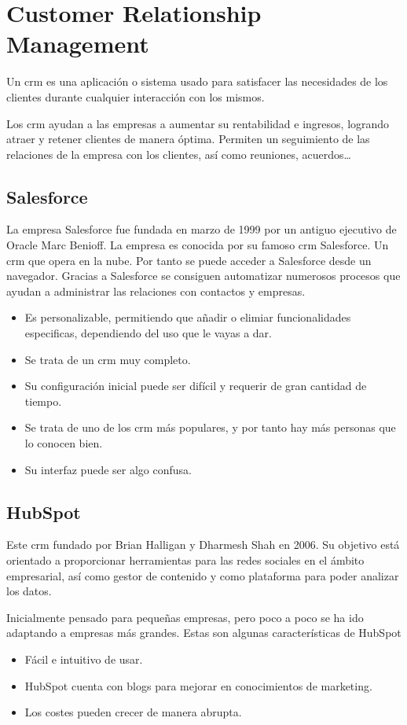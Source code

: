 \section{Customer Relationship Management}

Un \acrfull{crm} es una aplicación o sistema usado para satisfacer las necesidades de los clientes durante cualquier interacción con los mismos.

Los \acrshort{crm} ayudan a las empresas a aumentar su rentabilidad e ingresos, logrando atraer y retener clientes de manera óptima. 
Permiten un seguimiento de las relaciones de la empresa con los clientes, así como reuniones, acuerdos\ldots


\subsection{Salesforce}
La empresa Salesforce fue fundada en marzo de 1999 por un antiguo ejecutivo de Oracle Marc Benioff. La empresa es conocida por su famoso \acrshort{crm}
Salesforce. Un \acrshort{crm} que opera en la nube. Por tanto se puede acceder a Salesforce desde un navegador. Gracias a Salesforce se consiguen automatizar numerosos procesos que ayudan a administrar las relaciones con contactos y empresas.

\begin{itemize}
	\item Es personalizable, permitiendo que añadir o elimiar funcionalidades especificas, dependiendo del uso que le vayas a dar.
	\item Se trata de un \acrshort{crm} muy completo.
	\item Su configuración inicial puede ser difícil y requerir de gran cantidad de tiempo.
	\item Se trata de uno de los \acrshort{crm} más populares, y por tanto hay más personas que lo conocen bien.
	\item Su interfaz puede ser algo confusa.

\end{itemize}

\subsection{HubSpot}

Este \acrshort{crm} fundado por Brian Halligan y Dharmesh Shah en 2006. Su objetivo está orientado a proporcionar herramientas para las redes sociales en el ámbito empresarial, así como gestor de contenido y como plataforma para poder analizar los datos.

Inicialmente pensado para pequeñas empresas, pero poco a poco se ha ido adaptando a empresas más grandes.
Estas son algunas características de HubSpot
\begin{itemize}
	\item Fácil e intuitivo de usar.
	\item HubSpot cuenta con blogs para mejorar en conocimientos de marketing.
	\item Los costes pueden crecer de manera abrupta.
\end{itemize}